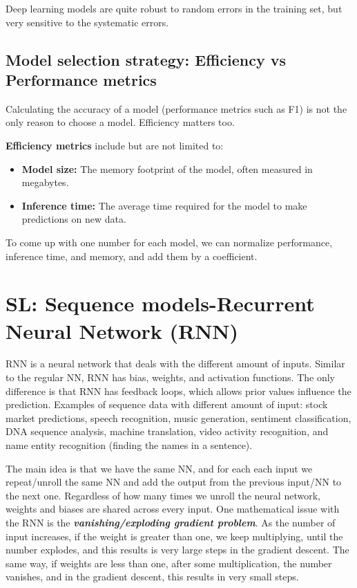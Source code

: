 \documentclass[12pt]{report}
\begin{document}
Deep learning models are quite robust to random errors in the training set, but very sensitive to the systematic errors.


\subsection{Model selection strategy: Efficiency vs Performance metrics}

Calculating the accuracy of a model (performance metrics such as F1) is not the only reason to choose a model. Efficiency matters too. 


\textbf{Efficiency metrics} include but are not limited to:
\begin{itemize}
	\item \textbf{Model size:} The memory footprint of the model, often measured in megabytes.
	\item \textbf{Inference time:} The average time required for the model to make predictions on new data.
\end{itemize}

To come up with one number for each model, we can normalize performance, inference time, and memory, and add them by a coefficient. 

\section{SL: Sequence models-Recurrent Neural Network (RNN)}

RNN is a neural network that deals with the different amount of inputs. Similar to the regular NN, RNN has bias, weights, and activation functions. The only difference is that RNN has feedback loops, which allows prior values influence the prediction. Examples of sequence data with different amount of input: stock market predictions, speech recognition, music generation, sentiment classification, DNA sequence analysis, machine translation, video activity recognition, and name entity recognition (finding the names in a sentence).

The main idea is that we have the same NN, and for each each input we repeat/unroll the same NN and add the output from the previous input/NN to the next one. Regardless of how many times we unroll the neural network, weights and biases are shared across every input. One mathematical issue with the RNN is the \textbf{\textit{vanishing/exploding gradient problem}}. As the number of input increases, if the weight is greater than one, we keep multiplying, until the number explodes, and this results is very large steps in the gradient descent.  The same way, if weights are less than one, after some multiplication, the number vanishes, and in the gradient descent, this results in very small steps.
\end{document}

